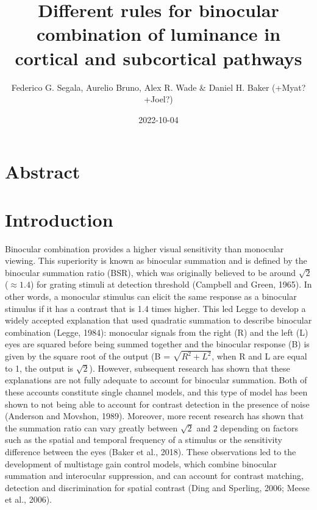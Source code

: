 \documentclass[
]{article}
\title{Different rules for binocular combination of luminance in cortical and subcortical pathways}
\author{Federico G. Segala, Aurelio Bruno, Alex R. Wade \& Daniel H. Baker (+Myat? +Joel?)}
\date{2022-10-04}
\begin{document}
\maketitle

\hypertarget{abstract}{%
\section{Abstract}\label{abstract}}

\hypertarget{introduction}{%
\section{Introduction}\label{introduction}}

Binocular combination provides a higher visual sensitivity than monocular viewing. This superiority is known as binocular summation and is defined by the binocular summation ratio (BSR), which was originally believed to be around \(\sqrt{2}\) (\(\approx1.4\)) for grating stimuli at detection threshold (Campbell and Green, 1965). In other words, a monocular stimulus can elicit the same response as a binocular stimulus if it has a contrast that is 1.4 times higher. This led Legge to develop a widely accepted explanation that used quadratic summation to describe binocular combination (Legge, 1984): monocular signals from the right (R) and the left (L) eyes are squared before being summed together and the binocular response (B) is given by the square root of the output (B = \(\sqrt{R^2 + L^2}\), when R and L are equal to 1, the output is \(\sqrt{2}\)). However, subsequent research has shown that these explanations are not fully adequate to account for binocular summation. Both of these accounts constitute single channel models, and this type of model has been shown to not being able to account for contrast detection in the presence of noise (Anderson and Movshon, 1989). Moreover, more recent research has shown that the summation ratio can vary greatly between \(\sqrt{2}\) and 2 depending on factors such as the spatial and temporal frequency of a stimulus or the sensitivity difference between the eyes (Baker et al., 2018). These observations led to the development of multistage gain control models, which combine binocular summation and interocular suppression, and can account for contrast matching, detection and discrimination for spatial contrast (Ding and Sperling, 2006; Meese et al., 2006).
\end{document}
